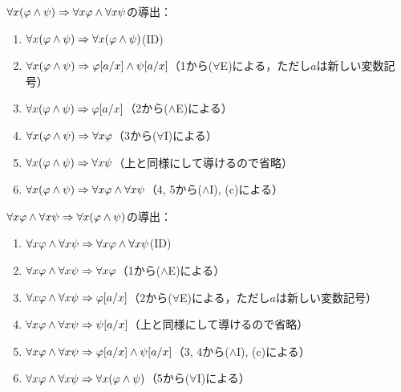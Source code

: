 \(\forall x \paren{\varphi \land \psi} \sequent \forall x \varphi \land \forall x \psi\)の導出：
\begin{enumerate}
	\item \(\forall x \paren{\varphi \land \psi} \sequent \forall x \paren{\varphi \land \psi}\)\quad (ID)
	\item \(\forall x \paren{\varphi \land \psi} \sequent \subst{\varphi}{a/x} \land \subst{\psi}{a/x}\)\quad （1から(\(\forall\)E)による，ただし\(a\)は新しい変数記号）
	\item \(\forall x \paren{\varphi \land \psi} \sequent \subst{\varphi}{a/x}\)\quad （2から(\(\land\)E)による）
	\item \(\forall x \paren{\varphi \land \psi} \sequent \forall x \varphi\)\quad （3から(\(\forall\)I)による）
	\item \(\forall x \paren{\varphi \land \psi} \sequent \forall x \psi\)\quad （上と同様にして導けるので省略）
	\item \(\forall x \paren{\varphi \land \psi} \sequent \forall x \varphi \land \forall x \psi\)\quad （4, 5から(\(\land\)I), (c)による）
\end{enumerate}

\(\forall x \varphi \land \forall x \psi \sequent \forall x \paren{\varphi \land \psi}\)の導出：
\begin{enumerate}
	\item \(\forall x \varphi \land \forall x \psi \Rightarrow \forall x \varphi \land \forall x \psi\)\quad (ID)
	\item \(\forall x \varphi \land \forall x \psi \Rightarrow \forall x \varphi\)\quad （1から(\(\land\)E)による）
	\item \(\forall x \varphi \land \forall x \psi \sequent \subst{\varphi}{a/x}\)\quad （2から(\(\forall\)E)による，ただし\(a\)は新しい変数記号）
	\item \(\forall x \varphi \land \forall x \psi \sequent \subst{\psi}{a/x}\)\quad （上と同様にして導けるので省略）
	\item \(\forall x \varphi \land \forall x \psi \sequent \subst{\varphi}{a/x} \land \subst{\psi}{a/x}\)\quad （3, 4から(\(\land\)I), (c)による）
	\item \(\forall x \varphi \land \forall x \psi \sequent \forall x \paren{\varphi \land \psi}\)\quad （5から(\(\forall\)I)による）
\end{enumerate}

